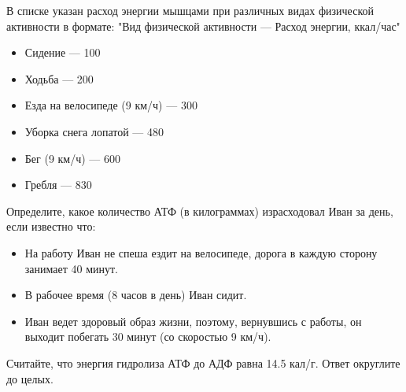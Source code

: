 
В списке указан расход энергии мышцами при различных
видах физической активности в формате: "Вид физической активности — Расход энергии, ккал/час"

\begin{itemize}
    \item Сидение — 100
    \item Ходьба — 200
    \item Езда на велосипеде (9 км/ч) — 300
    \item Уборка снега лопатой — 480
    \item Бег (9 км/ч) — 600
    \item Гребля — 830
\end{itemize}
 
Определите, какое количество АТФ
(в килограммах) израсходовал Иван за день, если известно что:

\begin{itemize}
    \item На работу Иван не спеша ездит на велосипеде, дорога в каждую сторону занимает 40 минут.
    \item В рабочее время (8 часов в день) Иван сидит.
    \item Иван ведет здоровый образ жизни, поэтому, вернувшись с работы, он выходит побегать 30 минут (со скоростью 9 км/ч).
\end{itemize}

Считайте, что энергия гидролиза
АТФ до АДФ равна 14.5 кал/г. Ответ округлите до целых.

